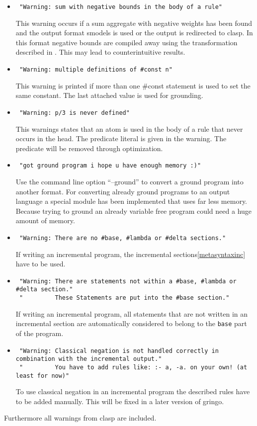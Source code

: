\documentclass[a4paper,10pt]{article}
\begin{document}
\begin{itemize}
 \item 
\begin{verbatim}
 "Warning: sum with negative bounds in the body of a rule"
\end{verbatim}
This warning occurs if a sum aggregate with negative weights has been found and the output format smodels is used or the output is redirected to clasp. In this format negative bounds are compiled away using the transformation described in \cite{lparseManual}. This may lead to counterintuitive results.
 \item 
\begin{verbatim}
 "Warning: multiple definitions of #const n"
\end{verbatim}
This warning is printed if more than one \#const statement is used to set the same constant.
The last attached value is used for grounding.
\item
\begin{verbatim}
 "Warning: p/3 is never defined"
\end{verbatim}
This warnings states that an atom is used in the body of a rule that never occurs in the head.
The predicate literal is given in the warning. The predicate will be removed through optimization.
\item
\begin{verbatim}
 "got ground program i hope u have enough memory :)"
\end{verbatim}
Use the command line option ``--ground'' to convert a ground program into another format.
For converting already ground programs to an output language a special module has been implemented that uses far less memory. Because trying to ground an already variable free program could need a huge amount of memory.
\item
\begin{verbatim}
 "Warning: There are no #base, #lambda or #delta sections."
\end{verbatim}
If writing an incremental program, the incremental sections\ref{metasyntaxinc} have to be used.
\item
\begin{verbatim}
 "Warning: There are statements not within a #base, #lambda or #delta section."
 "         These Statements are put into the #base section."
\end{verbatim}
If writing an incremental program, all statements that are not written in an incremental section are automatically considered to belong to the \texttt{base} part of the program.
\item
\begin{verbatim}
 "Warning: Classical negation is not handled correctly in combination with the incremental output."
 "         You have to add rules like: :- a, -a. on your own! (at least for now)"
\end{verbatim}
To use classical negation in an incremental program the described rules have to be added manually. This will be fixed in a later version of gringo.
\end{itemize}
Furthermore all warnings from clasp are included.
\end{document}
